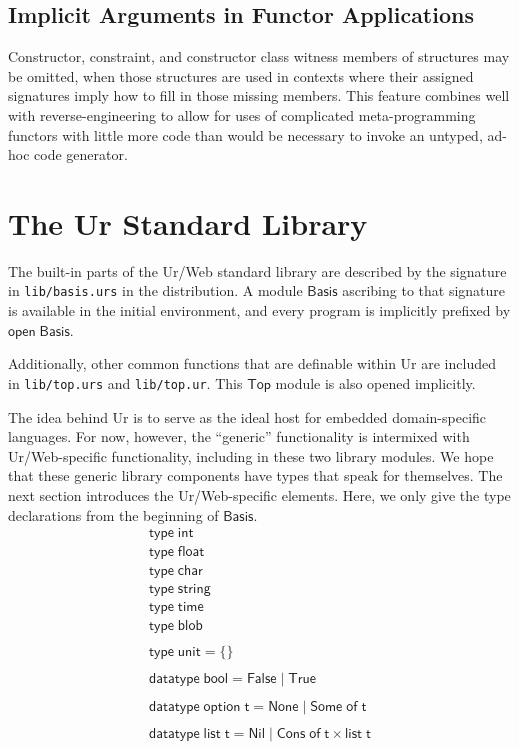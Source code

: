 \documentclass{article}
\newcommand{\mt}[1]{\mathsf{#1}}
\begin{document}
\subsection{Implicit Arguments in Functor Applications}

Constructor, constraint, and constructor class witness members of structures may be omitted, when those structures are used in contexts where their assigned signatures imply how to fill in those missing members.  This feature combines well with reverse-engineering to allow for uses of complicated meta-programming functors with little more code than would be necessary to invoke an untyped, ad-hoc code generator.


\section{The Ur Standard Library}

The built-in parts of the Ur/Web standard library are described by the signature in \texttt{lib/basis.urs} in the distribution.  A module $\mt{Basis}$ ascribing to that signature is available in the initial environment, and every program is implicitly prefixed by $\mt{open} \; \mt{Basis}$.

Additionally, other common functions that are definable within Ur are included in \texttt{lib/top.urs} and \texttt{lib/top.ur}.  This $\mt{Top}$ module is also opened implicitly.

The idea behind Ur is to serve as the ideal host for embedded domain-specific languages.  For now, however, the ``generic'' functionality is intermixed with Ur/Web-specific functionality, including in these two library modules.  We hope that these generic library components have types that speak for themselves.  The next section introduces the Ur/Web-specific elements.  Here, we only give the type declarations from the beginning of $\mt{Basis}$.
$$\begin{array}{l}
  \mt{type} \; \mt{int} \\
  \mt{type} \; \mt{float} \\
  \mt{type} \; \mt{char} \\
  \mt{type} \; \mt{string} \\
  \mt{type} \; \mt{time} \\
  \mt{type} \; \mt{blob} \\
  \\
  \mt{type} \; \mt{unit} = \{\} \\
  \\
  \mt{datatype} \; \mt{bool} = \mt{False} \mid \mt{True} \\
  \\
  \mt{datatype} \; \mt{option} \; \mt{t} = \mt{None} \mid \mt{Some} \; \mt{of} \; \mt{t} \\
  \\
  \mt{datatype} \; \mt{list} \; \mt{t} = \mt{Nil} \mid \mt{Cons} \; \mt{of} \; \mt{t} \times \mt{list} \; \mt{t}
\end{array}$$
\end{document}
